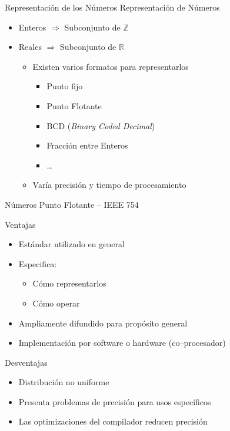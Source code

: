 \begin{frame}{Representación de los Números}
    Representación de Números
    \begin{itemize}
        \item Enteros $\Rightarrow$ Subconjunto de $\mathbb{Z}$
        \item Reales $\Rightarrow$ Subconjunto de $\mathbb{R}$
        \begin{itemize}
            \item Existen varios formatos para representarlos
            \begin{itemize}
                \item Punto fijo
                \item Punto Flotante
                \item BCD (\emph{Binary Coded Decimal})
                \item Fracción entre Enteros
                \item \dots
            \end{itemize}
            \item Varía precisión y tiempo de procesamiento
        \end{itemize}
    \end{itemize}
\end{frame}

\begin{frame}{Números Punto Flotante -- IEEE 754}
    \begin{block}{Ventajas}
        \begin{itemize}
            \item Estándar utilizado en general
            \item Especifica:
            \begin{itemize}
                \item Cómo representarlos
                \item Cómo operar
            \end{itemize}
            \item Ampliamente difundido para propósito general
            \item Implementación por software o hardware (co--procesador)
        \end{itemize}
    \end{block}
    \begin{block}{Desventajas}
        \begin{itemize}
            \item Distribución no uniforme
            \item Presenta problemas de precisión para usos específicos
            \item Las optimizaciones del compilador reducen precisión
        \end{itemize}
    \end{block}
\end{frame}